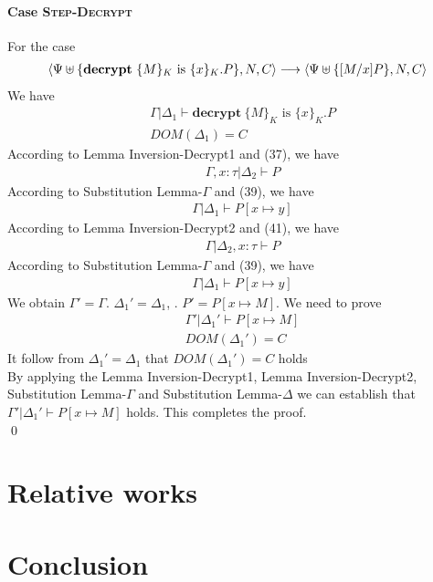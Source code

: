 \documentclass[master,english]{kuisthesis}
\theoremstyle{definition}
\begin{document}
\paragraph{Case \textsc{Step-Decrypt}} For the case
\begin{align*}
\langle\Psi \uplus\{ \text{\textbf{decrypt}}\ \{M\}_K
\text{ is } \{x\}_K . P\} , N, C\rangle &\longrightarrow\langle\Psi \uplus\{[M / x] P\} , N, C \rangle \\
\end{align*}\noindent
We have
\begin{align}
    &\Gamma | \Delta_1 \vdash \textbf{decrypt}\ \{M\}_K
\text{ is } \{x\}_K . P
    \\&DOM(\Delta_1) = C 
\end{align}\noindent
According to Lemma Inversion-Decrypt1 and (37), we have
\begin{align}
    &\Gamma, x:\tau | \Delta_2  \vdash  P  
\end{align}\noindent
According to Substitution Lemma-$\Gamma$ and (39), we have
\begin{align}
    &\Gamma | \Delta_1 \vdash P[x \mapsto y]  
\end{align}\noindent
According to Lemma Inversion-Decrypt2 and (41), we have
\begin{align}
    &\Gamma| \Delta_2, x:\tau   \vdash  P  
\end{align}\noindent
According to Substitution Lemma-$\Gamma$ and (39), we have
\begin{align}
    &\Gamma | \Delta_1 \vdash P[x \mapsto y]  
\end{align}\noindent
We obtain $\Gamma' = \Gamma$. $\Delta_1' = \Delta_1 $, . $P' = P[x \mapsto M] $. We need to prove
\begin{align*}
    &\Gamma' | \Delta_1' \vdash P [x \mapsto M]
    \\&DOM(\Delta_1') = C 
\end{align*}\noindent
It follow from $\Delta_1' = \Delta_1 $ that  $DOM(\Delta_1') = C $ holds
\\By applying the Lemma Inversion-Decrypt1, Lemma Inversion-Decrypt2, Substitution Lemma-$\Gamma$ and Substitution Lemma-$\Delta$  we can establish that  $ \Gamma' | \Delta_1' \vdash P [x \mapsto M]$ holds. This completes the proof.\\
\qed



\section{Relative works}\label{sec-structure}

\section{Conclusion}\label{sec-structure}

 
\end{document}
